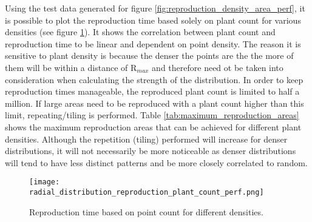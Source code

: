 Using the test data generated for figure \ref{fig:reproduction_density_area_perf}, it is possible to plot the reproduction time based solely on plant count for various densities (see figure \ref{fig:reproduction_plant_count_perf}). It shows the correlation between plant count and reproduction time to be linear and dependent on point density. The reason it is sensitive to plant density is because the denser the points are the the more of them will be within a distance of R$_{max}$ and therefore need ot be taken into consideration when calculating the strength of the distribution. In order to keep reproduction times manageable, the reproduced plant count is limited to half a million. If large areas need to be reproduced with a plant count higher than this limit, repeating/tiling is performed. Table \ref{tab:maximum_reproduction_areas} shows the maximum reproduction areas that can be achieved for different plant densities. Although the repetition (tiling) performed will increase for denser distributions, it will not necessarily be more noticeable as denser distributions will tend to have less distinct patterns and be more closely correlated to random.\\

\begin{figure}
\center
	\texttt{[image: radial\_distribution\_reproduction\_plant\_count\_perf.png]}
	\caption{ Reproduction time based on point count for different densities.}	
	\label{fig:reproduction_plant_count_perf}
\end{figure}

